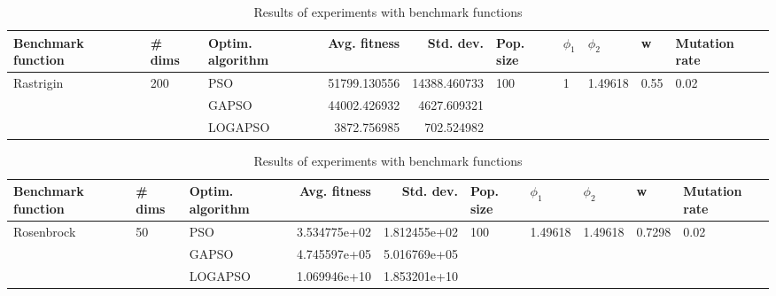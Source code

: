 \documentclass{article}
\begin{document}
\begin{table}
\centering
\caption{Results of experiments with benchmark functions}
\begin{tabular}{lllrrlllll}
\toprule
        Benchmark function &              \# dims & Optim. algorithm &  Avg. fitness &    Std. dev. &            Pop. size &         $\phi_{1}$ &               $\phi_{2}$ &                     w &         Mutation rate \\
\midrule
\multirow{3}{*}{Rastrigin} & \multirow{3}{*}{200} &              PSO &  51799.130556 & 14388.460733 & \multirow{3}{*}{100} & \multirow{3}{*}{1} & \multirow{3}{*}{1.49618} & \multirow{3}{*}{0.55} & \multirow{3}{*}{0.02} \\
                           &                      &            GAPSO &  44002.426932 &  4627.609321 &                      &                    &                          &                       &                       \\
                           &                      &          LOGAPSO &   3872.756985 &   702.524982 &                      &                    &                          &                       &                       \\
\bottomrule
\end{tabular}
\end{table}
\begin{table}
\centering
\caption{Results of experiments with benchmark functions}
\begin{tabular}{lllrrlllll}
\toprule
         Benchmark function &             \# dims & Optim. algorithm &  Avg. fitness &    Std. dev. &            Pop. size &               $\phi_{1}$ &               $\phi_{2}$ &                       w &         Mutation rate \\
\midrule
\multirow{3}{*}{Rosenbrock} & \multirow{3}{*}{50} &              PSO &  3.534775e+02 & 1.812455e+02 & \multirow{3}{*}{100} & \multirow{3}{*}{1.49618} & \multirow{3}{*}{1.49618} & \multirow{3}{*}{0.7298} & \multirow{3}{*}{0.02} \\
                            &                     &            GAPSO &  4.745597e+05 & 5.016769e+05 &                      &                          &                          &                         &                       \\
                            &                     &          LOGAPSO &  1.069946e+10 & 1.853201e+10 &                      &                          &                          &                         &                       \\
\bottomrule
\end{tabular}
\end{table}
\end{document}
